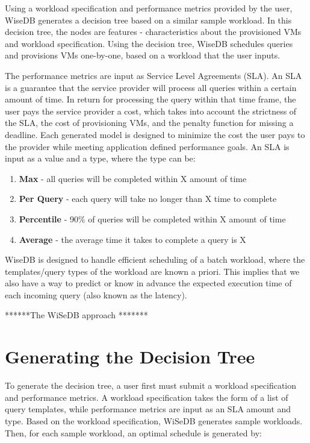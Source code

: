 \documentclass{brandiss}
\numberwithin{section}{chapter}
\numberwithin{figure}{chapter}
\theoremstyle{definition}
\theoremstyle{plain}
\theoremstyle{remark}
\begin{document}
Using a workload specification and performance metrics provided by the user, WiseDB generates a decision tree based on a similar sample workload. In this decision tree, the nodes are features - characteristics about the provisioned VMs and workload specification. Using the decision tree, WiseDB schedules queries and provisions VMs one-by-one, based on a workload that the user inputs.

The performance metrics are input as Service Level Agreements (SLA). An SLA is a guarantee that the service provider will process all queries within a certain amount of time. In return for processing the query within that time frame, the user pays the service provider a cost, which takes into account the strictness of the SLA, the cost of provisioning VMs, and the penalty function for missing a deadline. Each generated model is designed to minimize the cost the user pays to the provider while meeting application defined performance goals. An SLA is input as a value and a type, where the type can be:

\begin{enumerate}
\item \textbf{Max} - all queries will be completed within X amount of time
\item \textbf{Per Query} - each query will take no longer than X time to complete
\item \textbf{Percentile} - 90\% of queries will be completed within X amount of time
\item \textbf{Average} - the average time it takes to complete a query is X
\end{enumerate}

WiseDB is designed to handle efficient scheduling of a batch workload, where the templates/query types of the workload are known a priori. This implies that we also have a way to predict or know in advance the expected execution time of each incoming query (also known as the latency).

******The WiSeDB approach *******

\section{Generating the Decision Tree}

To generate the decision tree, a user first must submit a workload specification and performance metrics. A workload specification takes the form of a list of query templates, while performance metrics  are input as an SLA amount and type. Based on the workload specification, WiSeDB generates sample workloads. Then, for each sample workload, an optimal schedule is generated by:
\end{document}
